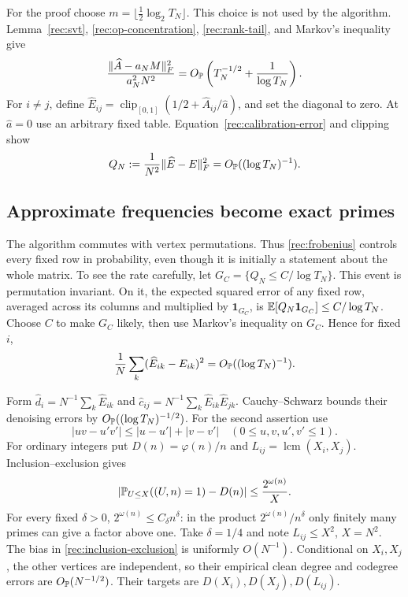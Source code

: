 For the proof choose $m=\lfloor\tfrac12\log_2T_N\rfloor$.
This choice is not used by the algorithm. Lemma~\ref{rec:svt},
\eqref{rec:op-concentration}, \eqref{rec:rank-tail}, and Markov's
inequality give
\[
 \frac{\|\widehat A-a_NM\|_F^2}{a_N^2N^2}
 =O_{\mathbb P}\left(T_N^{-1/2}+\frac1{\log T_N}\right).
\]
For $i\ne j$, define
$\widehat E_{ij}=\operatorname{clip}_{[0,1]}(1/2+\widehat A_{ij}/\widehat a)$,
and set the diagonal to zero. At $\widehat a=0$ use an arbitrary fixed
table. Equation~\eqref{rec:calibration-error} and clipping show
\begin{equation}\label{rec:frobenius}
 Q_N:=\frac1{N^2}\|\widehat E-E\|_F^2
 =O_{\mathbb P}((\log T_N)^{-1}).
\end{equation}

\subsection{Approximate frequencies become exact primes}

The algorithm commutes with vertex permutations. Thus
\eqref{rec:frobenius} controls every fixed row in probability, even
though it is initially a statement about the whole matrix. To see the
rate carefully, let $G_C=\{Q_N\le C/\log T_N\}$. This event is
permutation invariant. On it, the expected squared error of any fixed
row, averaged across its columns and multiplied by $\mathbf1_{G_C}$,
is $\mathbb E[Q_N\mathbf1_{G_C}]\le C/\log T_N$. Choose $C$ to make $G_C$
likely, then use Markov's inequality on $G_C$. Hence for fixed $i$,
\begin{equation}\label{rec:row-error}
 \frac1N\sum_k(\widehat E_{ik}-E_{ik})^2
 =O_{\mathbb P}((\log T_N)^{-1}).
\end{equation}

Form $\widehat d_i=N^{-1}\sum_k\widehat E_{ik}$ and
$\widehat c_{ij}=N^{-1}\sum_k\widehat E_{ik}\widehat E_{jk}$.
Cauchy--Schwarz bounds their denoising errors by
$O_{\mathbb P}((\log T_N)^{-1/2})$. For the second assertion use
\[
 |uv-u'v'|\le |u-u'|+|v-v'|\quad(0\le u,v,u',v'\le1).
\]
For ordinary integers put $D(n)=\varphi(n)/n$ and
$L_{ij}=\operatorname{lcm}(X_i,X_j)$. Inclusion--exclusion gives
\begin{equation}\label{rec:inclusion-exclusion}
 \left|\mathbb P_{U\le X}((U,n)=1)-D(n)\right|
 \le\frac{2^{\omega(n)}}X.
\end{equation}
For every fixed $\delta>0$, $2^{\omega(n)}\le C_\delta n^\delta$:
in the product $2^{\omega(n)}/n^\delta$ only finitely many primes can
give a factor above one. Take $\delta=1/4$ and note $L_{ij}\le X^2$,
$X=N^2$. The bias in \eqref{rec:inclusion-exclusion} is uniformly
$O(N^{-1})$. Conditional on $X_i,X_j$, the other vertices are
independent, so their empirical clean degree and codegree errors are
$O_{\mathbb P}(N^{-1/2})$. Their targets are $D(X_i),D(X_j),D(L_{ij})$.


